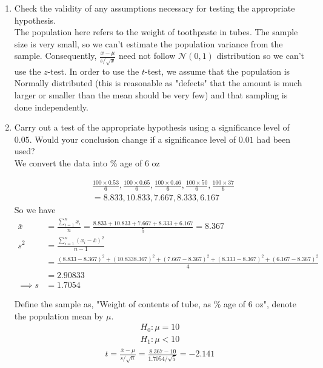 \begin{enumerate}

\item
Check the validity of any assumptions necessary for testing the appropriate hypothesis.\\
\newline
The population here refers to the weight of toothpaste in tubes. The sample size is very small, so we can't estimate the population variance from the sample. Consequently,  $\frac{x - \mu}{s/\sqrt{x}}$ need not follow $\mathcal{N}(0,1)$ distribution so we can't use the $z$-test. In order to use the $t$-test, we assume that the population is Normally distributed (this is reasonable as "defects" that the amount is much larger or smaller than the mean should be very few) and that sampling is done independently. 
\item
Carry out a test of the appropriate hypothesis using a significance level of $0.05$. Would your conclusion change if a significance level of $0.01$ had been used?\\
\newline
We convert the data into \% age of $6$ oz 

\begin{align*}
&\frac{100 \times 0.53}{6} , \frac{100 \times 0.65}{6} , \frac{100 \times 0.46}{6} , \frac{100 \times 50}{6} , \frac{100 \times 37}{6}\\
&= 8.833 , 10.833 , 7.667 , 8.333 , 6.167
\end{align*}
So we have 
\begin{align*}
\bar{x} &= \frac{\sum_{i = 1}^{n} x_i}{n} = \frac{8.833 + 10.833 + 7.667 + 8.333 +  6.167}{5}
        = 8.367\\
s^2 &= \frac{\sum_{i = 1}^{n} (x_i - \bar{x})^2}{n - 1}\\
 &= \frac{(8.833 - 8.367)^2 + (10.833 8.367)^2 + (7.667 - 8.367)^2 + (8.333- 8.367)^2+  (6.167- 8.367)^2}{4}\\
&= 2.90833\\
\implies s &= 1.7054
\end{align*}

Define the sample as, "Weight of contents of tube, as \% age of $6$ oz", denote the population mean by $\mu$.
\begin{align*}
H_0 : \mu = 10\\
H_1 : \mu < 10
\end{align*}
\begin{align*}
t = \frac{\bar{x} - \mu}{s/\sqrt{n}}
= \frac{8.367 - 10}{1.7054/\sqrt{5}}
=-2.141
\end{align*}


\end{enumerate}

